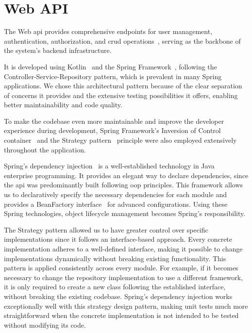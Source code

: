 \chapter{Web API} \label{cap:web_api}
The Web \ac{api} provides comprehensive endpoints for user management, authentication, authorization, and \ac{crud} operations~\cite{crud}, serving as the backbone of the system's backend infrastructure.

It is developed using Kotlin~\cite{kotlin} and the Spring Framework~\cite{spring-framework}, following the Controller-Service-Repository pattern, which is prevalent in many Spring~\cite{spring} applications. We chose this architectural pattern because of the clear separation of concerns it provides and the extensive testing possibilities it offers, enabling better maintainability and code quality.

To make the codebase even more maintainable and improve the developer experience during development, Spring Framework's Inversion of Control container~\cite{spring-ioc-container} and the Strategy pattern~\cite{strategy-pattern} principle were also employed extensively throughout the application.

Spring's dependency injection~\cite{spring-di} is a well-established technology in Java~\cite{java} enterprise programming. It provides an elegant way to declare dependencies, since the \ac{api} was predominantly built following \ac{oop} principles. This framework allows us to declaratively specify the necessary dependencies for each module and provides a BeanFactory interface~\cite{spring-bean-factory} for advanced configurations. Using these Spring technologies, object lifecycle management becomes Spring's responsibility.

The Strategy pattern allowed us to have greater control over specific implementations since it follows an interface-based approach. Every concrete implementation adheres to a well-defined interface, making it possible to change implementations dynamically without breaking existing functionality. This pattern is applied consistently across every module. For example, if it becomes necessary to change the repository implementation to use a different framework, it is only required to create a new class following the established interface, without breaking the existing codebase. Spring's dependency injection works exceptionally well with this strategy design pattern, making unit tests much more straightforward when the concrete implementation is not intended to be tested without modifying its code.


